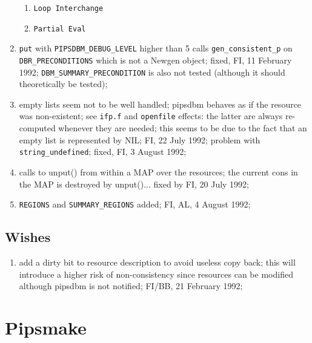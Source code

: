 \begin{enumerate}
\begin{enumerate}
    \item \verb+Loop Interchange+

    \item \verb+Partial Eval+

  \end{enumerate}

  \item \verb+put+ with \verb+PIPSDBM_DEBUG_LEVEL+ higher than 5 calls
        \verb+gen_consistent_p+ on \verb+DBR_PRECONDITIONS+ which is
        not a Newgen object; fixed, FI, 11 February 1992;
        \verb+DBM_SUMMARY_PRECONDITION+ is also not tested (although
        it should theoretically be tested);

  \item empty lists seem not to be well handled; pipsdbm behaves as
        if the resource was non-existent; see \verb+ifp.f+ and
        \verb+openfile+ effects: the latter are always re-computed
        whenever they are needed; this seems to be due to the fact
        that an empty list is represented by NIL; FI, 22 July 1992;
        problem with \verb+string_undefined+; fixed, FI, 3 August 1992;

  \item calls to unput() from within a MAP over the resources;
        the current cons in the MAP is destroyed by unput()...
        fixed by FI, 20 July 1992;

  \item \verb+REGIONS+ and \verb+SUMMARY_REGIONS+ added; FI, AL,
        4 August 1992;

\end{enumerate}

\subsection{Wishes}

\begin{enumerate}

  \item add a dirty bit to resource description to avoid useless copy back;
        this will introduce a higher risk of non-consistency since 
        resources can be modified although pipsdbm is not notified;
        FI/BB, 21 February 1992;

\end{enumerate}

\newpage

\section{Pipsmake}


